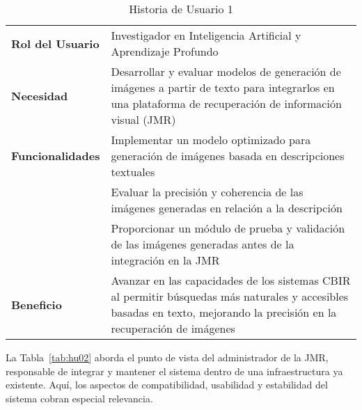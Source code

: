 \begin{table}[ht]
    \centering
    \renewcommand{\arraystretch}{1.5}
    \begin{tabular}{|>{\columncolor{gray!10}}p{4cm}|p{10cm}|}
        \hline
        \rowcolor{gray!30}
        \multicolumn{2}{|c|}{\textbf{Historia de Usuario 1}} \\
        \hline
        \textbf{Rol del Usuario} & Investigador en Inteligencia Artificial y Aprendizaje Profundo \\
        \hline
        \textbf{Necesidad} & Desarrollar y evaluar modelos de generación de imágenes a partir de texto para integrarlos en una plataforma de recuperación de información visual (JMR) \\
        \hline
        \textbf{Funcionalidades} & Implementar un modelo optimizado para generación de imágenes basada en descripciones textuales
        \\ & Evaluar la precisión y coherencia de las imágenes generadas en relación a la descripción
        \\ & Proporcionar un módulo de prueba y validación de las imágenes generadas antes de la integración en la JMR \\
        \hline
        \textbf{Beneficio} & Avanzar en las capacidades de los sistemas CBIR al permitir búsquedas más naturales y accesibles basadas en texto, mejorando la precisión en la recuperación de imágenes \\
        \hline
    \end{tabular}
    \caption{Historia de Usuario 1}
    \label{tab:hu01}
\end{table}

La Tabla~\ref{tab:hu02} aborda el punto de vista del administrador de la JMR, responsable de integrar y mantener el sistema dentro de una infraestructura ya existente. Aquí, los aspectos de compatibilidad, usabilidad y estabilidad del sistema cobran especial relevancia.

